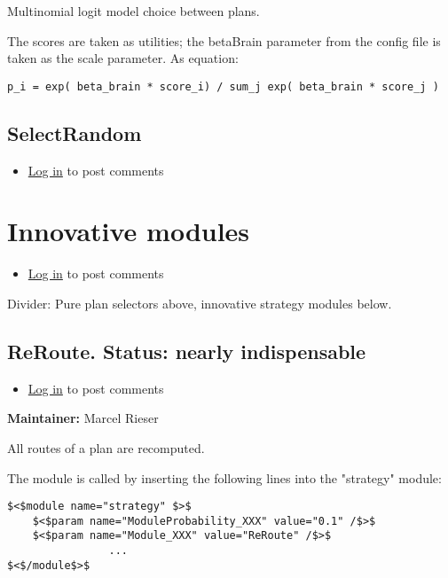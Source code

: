 \documentclass[a4paper,11pt]{report}
\begin{document}
Multinomial logit model choice between plans.

The scores are taken as utilities; the betaBrain parameter from the  config file is taken as the scale parameter. As equation:
\begin{verbatim}
p_i = exp( beta_brain * score_i) / sum_j exp( beta_brain * score_j )
\end{verbatim}

\subsection{SelectRandom}
\begin{itemize}
	\item \href{http://www.matsim.org/user/login?destination=comment/reply/701%23comment-form}{Log in} to post comments
\end{itemize}

\vfill\eject
\section{Innovative modules}

\begin{itemize}
	\item \href{http://www.matsim.org/user/login?destination=comment/reply/697%23comment-form}{Log in} to post comments
\end{itemize}

Divider: Pure plan selectors above, innovative strategy modules below.

\subsection{ReRoute.  Status: nearly indispensable}
\begin{itemize}
	\item \href{http://www.matsim.org/user/login?destination=comment/reply/573%23comment-form}{Log in} to post comments
\end{itemize}

\textbf{Maintainer:} Marcel Rieser

All routes of a plan are recomputed.

The module is called by inserting the following lines into the "strategy" module:
\begin{verbatim}
$<$module name="strategy" $>$
	$<$param name="ModuleProbability_XXX" value="0.1" /$>$
	$<$param name="Module_XXX" value="ReRoute" /$>$
                ...
$<$/module$>$
\end{verbatim}
\end{document}
